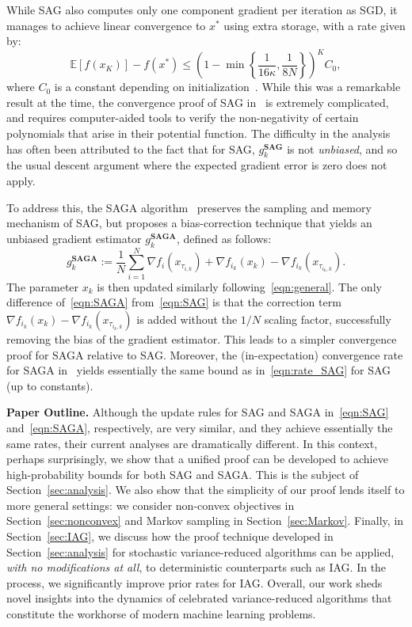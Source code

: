 \documentclass{article}
\theoremstyle{plain}
\theoremstyle{definition}
\newcommand{\E}{\mathbb{E}}
\newcommand{\bracket}[1]{\left[ #1\right]}
\newcommand{\paren}[1]{\left( #1\right)}
\begin{document}
While SAG also computes only one component gradient per iteration as SGD, it manages to achieve linear convergence to $x^*$ using extra storage, with a rate given by: 
\begin{equation}
    \E\bracket{f(x_K)} - f(x^*) \leq \paren{1-\min\left\{\frac{1}{16\kappa}, \frac{1}{8N}\right\}}^K C_0,\label{eqn:rate_SAG}
\end{equation}
where $C_0$ is a constant depending on initialization~\cite{SAG_proof}. While this was a remarkable result at the time, the convergence proof of SAG in~\citet{SAG_proof} is extremely complicated, and requires computer-aided tools to verify the non-negativity of certain polynomials that arise in their potential function. The difficulty in the analysis has often been attributed to the fact that for SAG, $g_k^\textbf{SAG}$ is not \emph{unbiased}, and so the usual descent argument where the expected gradient error is zero does not apply. 

To address this, the SAGA algorithm~\citep{SAGA} preserves the sampling and memory mechanism of SAG, but proposes a bias-correction technique that yields an unbiased gradient estimator $g_k^{\textbf{SAGA}}$, defined as follows:
\begin{equation}
g_k^{\textbf{SAGA}}:=\frac{1}{N}\sum_{i=1}^N \nabla f_i(x_{\tau_{i,k}})+\nabla f_{i_k}(x_k)-\nabla f_{i_k}(x_{\tau_{i_k, k}}).\label{eqn:SAGA}
\end{equation}
The parameter $x_k$ is then updated similarly following~\eqref{eqn:general}. The only difference of~\eqref{eqn:SAGA} from~\eqref{eqn:SAG} is that the correction term $\nabla f_{i_k}(x_k)-\nabla f_{i_k}(x_{\tau_{i_k,k}})$ is added without the $1/N$ scaling factor, successfully removing the bias of the gradient estimator. This leads to a simpler convergence proof for SAGA relative to SAG. Moreover, the (in-expectation) convergence rate for SAGA in~\citet{SAGA} yields essentially the same bound as in~\eqref{eqn:rate_SAG} for SAG (up to constants). 

\textbf{Paper Outline.} Although the update rules for SAG and SAGA in~\eqref{eqn:SAG} and~\eqref{eqn:SAGA}, respectively, are very similar, and they achieve essentially the same rates, their current analyses are dramatically different. In this context, perhaps surprisingly, we show that a unified proof can be developed to achieve high-probability bounds for both SAG and SAGA. This is the subject of Section~\ref{sec:analysis}. We also show that the simplicity of our proof lends itself to more general settings: we consider non-convex objectives in Section~\ref{sec:nonconvex} and Markov sampling in Section~\ref{sec:Markov}. Finally, in Section~\ref{sec:IAG}, we discuss how the proof technique developed in Section~\ref{sec:analysis} for stochastic variance-reduced algorithms can be applied, \emph{with no modifications at all}, to deterministic counterparts such as IAG. In the process, we significantly improve prior rates for IAG. Overall, our work sheds novel insights into the dynamics of celebrated variance-reduced algorithms that constitute the workhorse of modern machine learning problems. 
\end{document}
